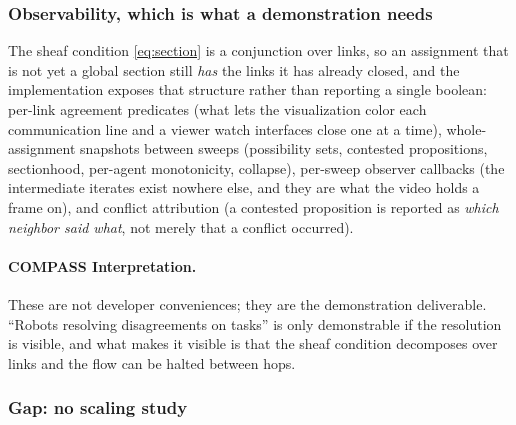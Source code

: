 \documentclass[11pt]{article}
\newif\ifshowcomments
\theoremstyle{definition}
\theoremstyle{remark}
\newcommand{\task}[1]{%
    \ifshowcomments
        ~\todo[inline, color=buzzgold!60, textcolor=black,caption={Task}]{{\bf Task:} #1}%
    \fi
}
\newcommand{\ai}[1]{%
    \ifshowcomments
        \noindent\textcolor{techred}{[AI Agent]: #1}%
    \fi
}
\begin{document}
\subsubsection{Observability, which is what a demonstration needs}

The sheaf condition \eqref{eq:section} is a conjunction over links, so an assignment that is not
yet a global section still \emph{has} the links it has already closed, and the implementation
exposes that structure rather than reporting a single boolean: per-link agreement predicates
(what lets the visualization color each communication line and a viewer watch interfaces close
one at a time), whole-assignment snapshots between sweeps (possibility sets, contested
propositions, sectionhood, per-agent monotonicity, collapse), per-sweep observer callbacks (the
intermediate iterates exist nowhere else, and they are what the video holds a frame on), and
conflict attribution (a contested proposition is reported as \emph{which neighbor said what},
not merely that a conflict occurred).

\paragraph{COMPASS Interpretation.}
These are not developer conveniences; they are the demonstration deliverable.
``Robots resolving disagreements on tasks'' is only demonstrable if the resolution is visible,
and what makes it visible is that the sheaf condition decomposes over links and the flow can be
halted between hops.

\subsubsection{Gap: no scaling study}
\label{sec:scaling-gap}

\task{Produce a scaling study: solver time and rounds-to-convergence as functions of the number
of agents, the number of propositions per stalk, and the topology diameter. The measurement
hooks already exist in the benchmark harness.}

\ai{\textbf{Gap, partially closed since drafted.} Subtask~4.2 asks for optimization ``for
performance and scalability.'' Performance is addressed and measured above. Scalability now has
one direct data point beyond demonstration size: a seeded 32-agent instance of the mission
sheaf (33 links, diameter 14, 198 link--room components) reaches its global section at sweep 6
at a mean of 2.2\,s of wall clock per sweep for the whole network
(\Cref{sec:app-findings}), and rounds-to-convergence tracked $\mathrm{diam}(G)+1$ across every
campaign, independent of stalk size. A systematic timing \emph{curve} in agents, propositions,
and diameter---as opposed to one scaled instance---remains unproduced, and the task box above is
retained for it; the harness already records everything the sweep needs.}
\end{document}
